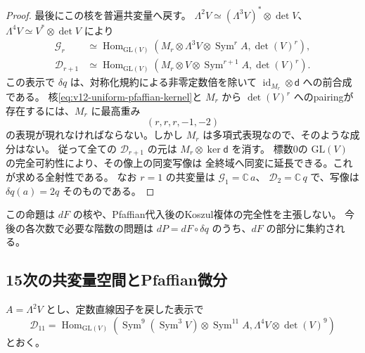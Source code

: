 \documentclass[a4paper,11pt]{ltjsarticle}
\theoremstyle{definition}
\newcommand{\CC}{\mathbb C}
\begin{document}
\begin{proof}
最後にこの核を普遍共変量へ戻す。
$\Lambda^2V\simeq(\Lambda^3V)^*\otimes\det V$、
$\Lambda^4V\simeq V^*\otimes\det V$ により
\begin{align*}
 \mathcal G_r&\simeq\operatorname{Hom}_{\mathrm{GL}(V)}
 \left(M_r\otimes\Lambda^3V\otimes\operatorname{Sym}^rA,
       \det(V)^r\right),\\
 \mathcal D_{r+1}&\simeq\operatorname{Hom}_{\mathrm{GL}(V)}
 \left(M_r\otimes V\otimes\operatorname{Sym}^{r+1}A,
       \det(V)^r\right).
\end{align*}
この表示で $\delta q$ は、対称化規約による非零定数倍を除いて
$\operatorname{id}_{M_r}\otimes\mathsf d$ への前合成である。
核\eqref{eq:v12-uniform-pfaffian-kernel}と $M_r$ から
$\det(V)^r$ へのpairingが存在するには、$M_r$ に最高重み
\[
 (r,r,r,-1,-2)
\]
の表現が現れなければならない。しかし $M_r$ は多項式表現なので、そのような成分はない。
従って全ての $\mathcal D_{r+1}$ の元は $M_r\otimes\ker\mathsf d$ を消す。
標数0の $\mathrm{GL}(V)$ の完全可約性により、その像上の同変写像は
全終域へ同変に延長できる。これが求める全射性である。
なお $r=1$ の共変量は $\mathcal G_1=\CC\,a$、
$\mathcal D_2=\CC\,q$ で、写像は $\delta q(a)=2q$ そのものである。
\end{proof}

この命題は $dF$ の核や、Pfaffian代入後のKoszul複体の完全性を主張しない。
今後の各次数で必要な階数の問題は
$dP=dF\circ\delta q$ のうち、$dF$ の部分に集約される。

\subsection{15次の共変量空間とPfaffian微分}
\label{subsec:v12-fifteenth-characters}

$A=\Lambda^2V$ とし、定数直線因子を戻した表示で
\[
 \mathcal D_{11}=\operatorname{Hom}_{\mathrm{GL}(V)}
 \left(\operatorname{Sym}^{9}(\operatorname{Sym}^3V)
       \otimes\operatorname{Sym}^{11}A,
       \Lambda^4V\otimes\det(V)^9\right)
\]
とおく。
\end{document}
